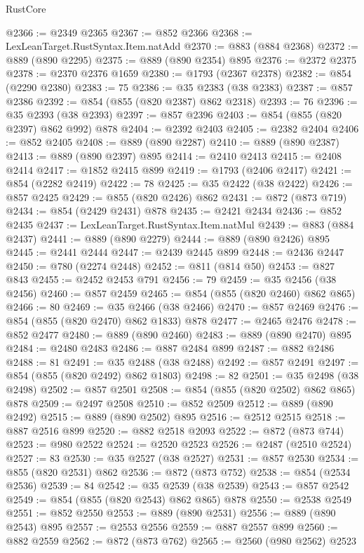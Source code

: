 \begin{lexlean}{RustCore}
\begin{coremodule}
@2366 := @2349 @2365
@2367 := @852 @2366
@2368 := LexLeanTarget.RustSyntax.Item.natAdd
@2370 := @883 (@884 @2368)
@2372 := @889 (@890 @2295)
@2375 := @889 (@890 @2354) @895
@2376 := @2372 @2375
@2378 := @2370 @2376 @1659
@2380 := @1793 (@2367 @2378)
@2382 := @854 (@2290 @2380)
@2383 := 75
@2386 := @35 @2383 (@38 @2383)
@2387 := @857 @2386
@2392 := @854 (@855 (@820 @2387) @862 @2318)
@2393 := 76
@2396 := @35 @2393 (@38 @2393)
@2397 := @857 @2396
@2403 := @854 (@855 (@820 @2397) @862 @992) @878
@2404 := @2392 @2403
@2405 := @2382 @2404
@2406 := @852 @2405
@2408 := @889 (@890 @2287)
@2410 := @889 (@890 @2387)
@2413 := @889 (@890 @2397) @895
@2414 := @2410 @2413
@2415 := @2408 @2414
@2417 := @1852 @2415 @899
@2419 := @1793 (@2406 @2417)
@2421 := @854 (@2282 @2419)
@2422 := 78
@2425 := @35 @2422 (@38 @2422)
@2426 := @857 @2425
@2429 := @855 (@820 @2426) @862
@2431 := @872 (@873 @719)
@2434 := @854 (@2429 @2431) @878
@2435 := @2421 @2434
@2436 := @852 @2435
@2437 := LexLeanTarget.RustSyntax.Item.natMul
@2439 := @883 (@884 @2437)
@2441 := @889 (@890 @2279)
@2444 := @889 (@890 @2426) @895
@2445 := @2441 @2444
@2447 := @2439 @2445 @899
@2448 := @2436 @2447
@2450 := @780 (@2274 @2448)
@2452 := @811 (@814 @50)
@2453 := @827 @843
@2455 := @2452 @2453 @791
@2456 := 79
@2459 := @35 @2456 (@38 @2456)
@2460 := @857 @2459
@2465 := @854 (@855 (@820 @2460) @862 @865)
@2466 := 80
@2469 := @35 @2466 (@38 @2466)
@2470 := @857 @2469
@2476 := @854 (@855 (@820 @2470) @862 @1833) @878
@2477 := @2465 @2476
@2478 := @852 @2477
@2480 := @889 (@890 @2460)
@2483 := @889 (@890 @2470) @895
@2484 := @2480 @2483
@2486 := @887 @2484 @899
@2487 := @882 @2486
@2488 := 81
@2491 := @35 @2488 (@38 @2488)
@2492 := @857 @2491
@2497 := @854 (@855 (@820 @2492) @862 @1803)
@2498 := 82
@2501 := @35 @2498 (@38 @2498)
@2502 := @857 @2501
@2508 := @854 (@855 (@820 @2502) @862 @865) @878
@2509 := @2497 @2508
@2510 := @852 @2509
@2512 := @889 (@890 @2492)
@2515 := @889 (@890 @2502) @895
@2516 := @2512 @2515
@2518 := @887 @2516 @899
@2520 := @882 @2518 @2093
@2522 := @872 (@873 @744)
@2523 := @980 @2522
@2524 := @2520 @2523
@2526 := @2487 (@2510 @2524)
@2527 := 83
@2530 := @35 @2527 (@38 @2527)
@2531 := @857 @2530
@2534 := @855 (@820 @2531) @862
@2536 := @872 (@873 @752)
@2538 := @854 (@2534 @2536)
@2539 := 84
@2542 := @35 @2539 (@38 @2539)
@2543 := @857 @2542
@2549 := @854 (@855 (@820 @2543) @862 @865) @878
@2550 := @2538 @2549
@2551 := @852 @2550
@2553 := @889 (@890 @2531)
@2556 := @889 (@890 @2543) @895
@2557 := @2553 @2556
@2559 := @887 @2557 @899
@2560 := @882 @2559
@2562 := @872 (@873 @762)
@2565 := @2560 (@980 @2562) @2523

\end{coremodule}
\end{lexlean}
